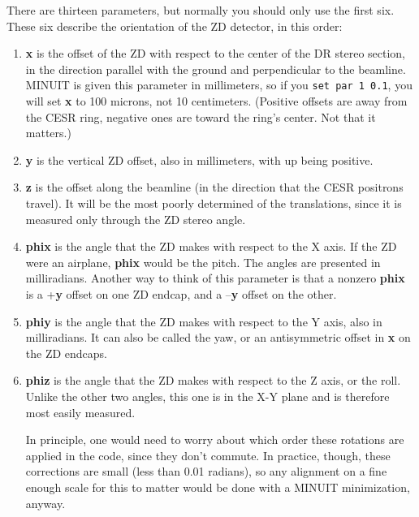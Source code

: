 \documentclass[12pt]{article}
\begin{document}
There are thirteen parameters, but normally you should only use the
first six.  These six describe the orientation of the ZD detector, in
this order:
\begin{enumerate}

  \item {\bf x} is the offset of the ZD with respect to the center of
  the DR stereo section, in the direction parallel with the ground and
  perpendicular to the beamline.  MINUIT is given this parameter in
  millimeters, so if you {\tt set par 1 0.1}, you will set {\bf x} to
  100 microns, not 10 centimeters.  (Positive offsets are away from
  the CESR ring, negative ones are toward the ring's center.  Not that
  it matters.)

  \item {\bf y} is the vertical ZD offset, also in millimeters, with
  up being positive.

  \item {\bf z} is the offset along the beamline (in the direction
  that the CESR positrons travel).  It will be the most poorly
  determined of the translations, since it is measured only through
  the ZD stereo angle.

  \item {\bf phix} is the angle that the ZD makes with respect to the
  X axis.  If the ZD were an airplane, {\bf phix} would be the pitch.
  The angles are presented in milliradians.  Another way to think of
  this parameter is that a nonzero {\bf phix} is a +{\bf y} offset on
  one ZD endcap, and a --{\bf y} offset on the other.

  \item {\bf phiy} is the angle that the ZD makes with respect to the
  Y axis, also in milliradians.  It can also be called the yaw, or an
  antisymmetric offset in {\bf x} on the ZD endcaps.

  \item {\bf phiz} is the angle that the ZD makes with respect to the
  Z axis, or the roll.  Unlike the other two angles, this one is in
  the X-Y plane and is therefore most easily measured.

  In principle, one would need to worry about which order these
  rotations are applied in the code, since they don't commute.  In
  practice, though, these corrections are small (less than 0.01
  radians), so any alignment on a fine enough scale for this to matter
  would be done with a MINUIT minimization, anyway.

\end{enumerate}
\end{document}
